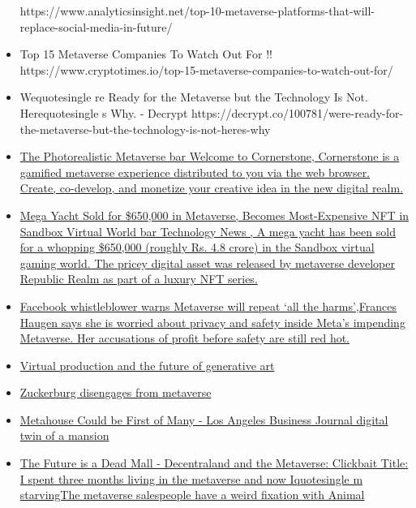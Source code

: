 \begin{itemize}
  https://www.analyticsinsight.net/top-10-metaverse-platforms-that-will-replace-social-media-in-future/
\item
  Top 15 Metaverse Companies To Watch Out For !!
  https://www.cryptotimes.io/top-15-metaverse-companies-to-watch-out-for/
\item
  Wequotesingle re Ready for the Metaverse but the Technology Is
  Not. Herequotesingle s Why. - Decrypt
  https://decrypt.co/100781/were-ready-for-the-metaverse-but-the-technology-is-not-heres-why
\item
  \href{https://cornerstone.land/}{The Photorealistic Metaverse
  bar{} Welcome to Cornerstone, Cornerstone is a gamified metaverse
  experience distributed to you via the web browser. Create, co-develop,
  and monetize your creative idea in the new digital realm.}
\item
  \href{https://gadgets.ndtv.com/cryptocurrency/news/mega-yacht-sold-usd-650000-metaverse-most-expensive-nft-sandbox-virtual-world-2630187}{Mega
  Yacht Sold for \$650,000 in Metaverse, Becomes Most-Expensive NFT in
  Sandbox Virtual World bar{} Technology News , A mega yacht has
  been sold for a whopping \$650,000 (roughly Rs. 4.8 crore) in the
  Sandbox virtual gaming world. The pricey digital asset was released by
  metaverse developer Republic Realm as part of a luxury NFT series.}
\item
  \href{https://cointelegraph.com/news/facebook-whistleblower-warns-metaverse-will-repeat-the-harms}{Facebook
  whistleblower warns Metaverse will repeat `all the harms',Frances
  Haugen says she is worried about privacy and safety inside Meta's
  impending Metaverse. Her accusations of profit before safety are still
  red hot.}
\item
  \href{https://virtualproducer.io/generative-ai-and-the-future-of-filmmaking/}{Virtual
  production and the future of generative art}
\item
  \href{https://www.thestreet.com/technology/mark-zuckerberg-quietly-buries-the-metaverse}{Zuckerburg
  disengages from metaverse}
\item
  \href{https://labusinessjournal.com/featured/metahouse-could-be-first-of-many/}{Metahouse
  Could be First of Many - Los Angeles Business Journal digital twin of
  a mansion}
\item
  \href{https://www.youtube.com/watch?v=EiZhdpLXZ8Q}{The Future is a
  Dead Mall - Decentraland and the Metaverse: Clickbait Title: I spent
  three months living in the metaverse and now Iquotesingle m
  starvingThe metaverse salespeople have a weird fixation with Animal
}
\end{itemize}
